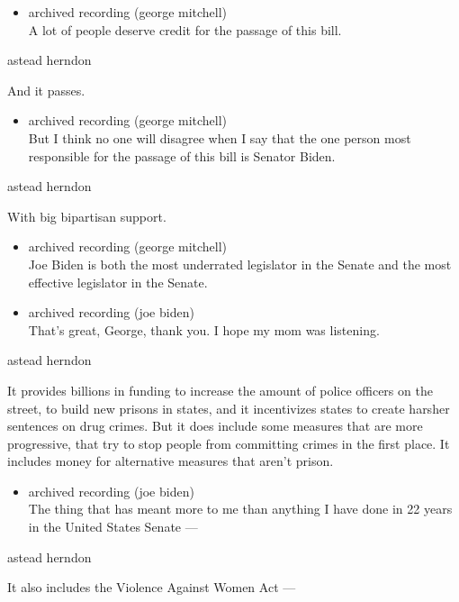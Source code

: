 \begin{itemize}
\tightlist
\item
  archived recording (george mitchell)\\
  A lot of people deserve credit for the passage of this bill.
\end{itemize}

astead herndon

And it passes.

\begin{itemize}
\tightlist
\item
  archived recording (george mitchell)\\
  But I think no one will disagree when I say that the one person most
  responsible for the passage of this bill is Senator Biden.
\end{itemize}

astead herndon

With big bipartisan support.

\begin{itemize}
\item
  archived recording (george mitchell)\\
  Joe Biden is both the most underrated legislator in the Senate and the
  most effective legislator in the Senate.
\item
  archived recording (joe biden)\\
  That's great, George, thank you. I hope my mom was listening.
\end{itemize}

astead herndon

It provides billions in funding to increase the amount of police
officers on the street, to build new prisons in states, and it
incentivizes states to create harsher sentences on drug crimes. But it
does include some measures that are more progressive, that try to stop
people from committing crimes in the first place. It includes money for
alternative measures that aren't prison.

\begin{itemize}
\tightlist
\item
  archived recording (joe biden)\\
  The thing that has meant more to me than anything I have done in 22
  years in the United States Senate ---
\end{itemize}

astead herndon

It also includes the Violence Against Women Act ---

